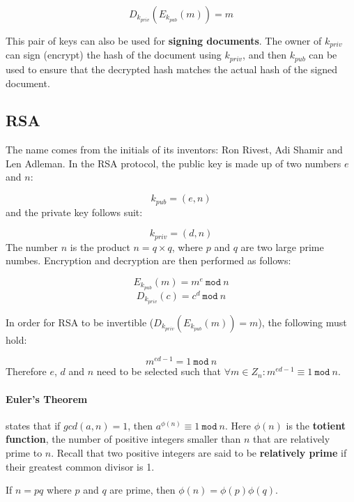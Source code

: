 \documentclass[12pt, letterpaper]{article}
\begin{document}
\[
  D_{k_{priv}} (E_{k_{pub}} (m)) = m
\]

This pair of keys can also be used for \textbf{signing documents}.
The owner of $k_{priv}$ can sign (encrypt) the hash of the document using $k_{priv}$, and then $k_{pub}$ can be used to ensure that the decrypted hash matches the actual hash of the signed document.

\subsection{RSA}

The name comes from the initials of its inventors: Ron Rivest, Adi Shamir and Len Adleman.
In the RSA protocol, the public key is made up of two numbers $e$ and $n$:

\[
  k_{pub} = (e, n)
\]
and the private key follows suit:

\[
  k_{priv} = (d, n)
\]
The number $n$ is the product $n = q \times q$, where $p$ and $q$ are two large prime numbes.
Encryption and decryption are then performed as follows:

\[
  E_{k_{pub}} (m) = m^e \: \mathtt{mod} \: n
\]
\[
  D_{k_{priv}} (c) = c^d \: \mathtt{mod} \: n
\]

In order for RSA to be invertible ($D_{k_{priv}} (E_{k_{pub}} (m)) = m$), the following must hold:

\[
  m^{ed - 1} = 1 \: \mathtt{mod} \: n
\]
Therefore $e$, $d$ and $n$ need to be selected such that $\forall m \in Z_n: m^{ed-1} \equiv 1 \: \mathtt{mod} \: n$.

\paragraph{Euler's Theorem} states that if $gcd(a, n) = 1$, then $a^{\phi(n)} \equiv 1 \: \mathtt{mod} \: n$.
Here $\phi(n)$ is the \textbf{totient function}, the number of positive integers smaller than $n$ that are relatively prime to $n$.
Recall that two positive integers are said to be \textbf{relatively prime} if their greatest common divisor is 1.

If $n = pq$ where $p$ and $q$ are prime, then $\phi(n) = \phi(p) \phi(q)$.
\end{document}
